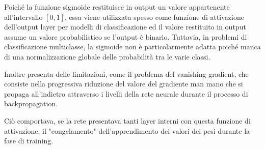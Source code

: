 Poiché la funzione sigmoide restituisce in output un valore appartenente all’intervallo
 $[0, 1]$, essa viene utilizzata spesso come funzione di attivazione dell’output layer per
 modelli di classificazione ed il valore restituito in output assume un valore probabilistico
 se l’output è binario. Tuttavia, in problemi di classificazione multiclasse, 
 la sigmoide non è particolarmente adatta poiché manca di una normalizzazione 
 globale delle probabilità tra le varie classi.

Inoltre presenta delle limitazioni, come il problema del vanishing gradient, che
consiste nella progressiva riduzione del valore del gradiente man mano che si 
propaga all’indietro attraverso i livelli della rete neurale durante il 
processo di backpropagation.

Ciò comportava, se la rete presentava tanti layer interni con questa funzione di 
attivazione, il "congelamento" dell'apprendimento dei valori dei pesi durante 
la fase di training.



